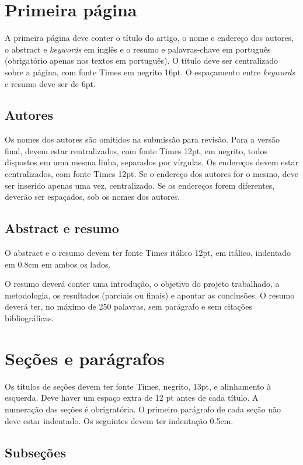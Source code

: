 \documentclass[12pt]{article}
\begin{document}
\section{Primeira página}

A primeira página deve conter o título do artigo, o nome e endereço
dos autores, o abstract e \textit{keywords} em inglês e o resumo e
palavras-chave em português (obrigatório apenas nos textos em
português). O título deve ser centralizado sobre a página, com fonte
Times em negrito 16pt. O espaçamento entre \textit{keywords} e resumo
deve ser de 6pt.

\subsection{Autores}
\label{sec:autores}

Os nomes dos autores são omitidos na submissão para revisão. Para a
versão final, devem estar centralizados, com fonte Times 12pt, em
negrito, todos dispostos em uma mesma linha, separados por vírgulas.
Os endereços devem estar centralizados, com fonte Times 12pt. Se o
endereço dos autores for o mesmo, deve ser inserido apenas uma vez,
centralizado. Se os endereços forem diferentes, deverão ser espaçados,
sob os nomes dos autores.

\subsection{Abstract e resumo}
\label{sec:abstract-e-resumo}

O abstract e o resumo devem ter fonte Times itálico 12pt, em itálico,
indentado em 0.8cm em ambos os lados.

O resumo deverá conter uma introdução, o objetivo do projeto
trabalhado, a metodologia, os resultados (parciais ou finais) e
apontar as conclusões. O resumo deverá ter, no máximo de 250 palavras,
sem parágrafo e sem citações bibliográficas.


\section{Seções e parágrafos}

Os títulos de seções devem ter fonte Times, negrito, 13pt, e
alinhamento à esquerda. Deve haver um espaço extra de 12 pt antes de
cada título. A numeração das seções é obrigratória. O primeiro
parágrafo de cada seção não deve estar indentado. Os seguintes devem
ter indentação 0.5cm.

\subsection{Subseções}
\end{document}
